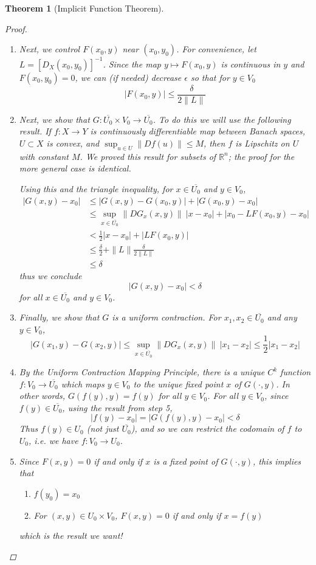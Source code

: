 \documentclass[12pt]{amsart}         %
\newtheorem{theorem}{Theorem}[section]
\theoremstyle{remark}
\newcommand{\R}{\mathbb{R}}
\begin{document}
\begin{theorem}[Implicit Function Theorem]
\begin{proof}
\begin{enumerate}
\item Next, we control $F(x_0, y)$ near $(x_0, y_0)$. For convenience, let $L = [D_X(x_0, y_0)]^{-1}$. Since  the map $y \mapsto F(x_0, y)$ is continuous in $y$ and $F(x_0, y_0) = 0$, we can (if needed) decrease $\epsilon$ so that for $y \in V_0$
\[
|F(x_0, y)| \leq \frac{\delta}{2 \|L\|}
\]

\item Next, we show that $G: \overline{U_0} \times V_0 \rightarrow \overline{U_0}$. To do this we will use the following result. If $f: X \rightarrow Y$ is continuously differentiable map between Banach spaces, $U \subset X$ is convex, and $\sup_{u \in U} \|Df(u)\| \leq M$, then $f$ is Lipschitz on $U$ with constant $M$. We proved this result for subsets of $\R^n$; the proof for the more general case is identical.

Using this and the triangle inequality, for $x \in \overline{U_0}$ and $y \in V_0$,
\begin{align*}
|G(x, y) - x_0| &\leq |G(x, y) - G(x_0, y)| + |G(x_0, y) - x_0| \\
&\leq \sup_{x\in \overline{U_0}}\|DG_x(x, y)\|\:|x - x_0| + |x_0 - L F(x_0, y) - x_0 | \\
&< \frac{1}{2} |x - x_0| + |L F(x_0, y)| \\
&\leq \frac{\delta}{2} + \|L\| \frac{\delta}{2 \|L\|} \\
&\leq \delta
\end{align*} 
thus we conclude
\[
|G(x, y) - x_0| < \delta
\]
for all $x \in \overline{U_0}$ and $y \in V_0$.

\item Finally, we show that $G$ is a uniform contraction. For $x_1, x_2 \in \overline{U_0}$ and any $y \in V_0$,
\[
|G(x_1, y) - G(x_2, y)| \leq \sup_{x\in \overline{U_0}}\|DG_x(x, y)\|\:|x_1 - x_2| \leq \frac{1}{2}|x_1 - x_2|
\]

\item By the Uniform Contraction Mapping Principle, there is a unique $C^k$ function $f: V_0 \rightarrow \overline{U_0}$ which maps $y \in V_0$ to the unique fixed point $x$ of $G(\cdot, y)$. In other words, $G(f(y),y) = f(y)$ for all $y \in V_0$. For all $y \in V_0$, since $f(y) \in \overline{U_0}$, using the result from step 5,
\[
|f(y) - x_0| = |G(f(y), y) - x_0| < \delta
\]
Thus $f(y) \in U_0$ (not just $\overline{U_0}$), and so we can restrict the codomain of $f$ to $U_0$, i.e. we have $f: V_0 \rightarrow U_0$.

\item Since $F(x, y) = 0$ if and only if $x$ is a fixed point of $G(\cdot, y)$, this implies that 
	\begin{enumerate}
	\item $f(y_0) = x_0$
	\item For $(x, y) \in U_0 \times V_0$, $F(x, y) = 0$ if and only if $x = f(y)$
	\end{enumerate}
which is the result we want!


\end{enumerate}
\end{proof}
\end{theorem}
\end{document}
